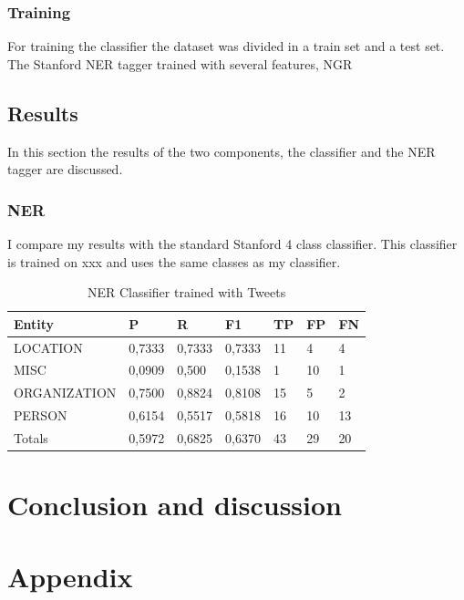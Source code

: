 \documentclass[
10pt, %
a4paper, %
oneside, %
headinclude,footinclude, %
BCOR5mm, %
]{scrartcl}
\begin{document}
\subsubsection{Training}
For training the classifier the dataset was divided in a train set and a test set. The Stanford NER tagger trained with several features, NGR


\newpage
\subsection{Results}
In this section the results of the two components, the classifier and the NER tagger are discussed.







\subsubsection{NER}
I compare my results with the standard Stanford 4 class classifier. This classifier is trained on xxx and uses the same classes as my classifier.

\begin{table}[h]
\caption[NER Classifier trained with Tweets]{NER Classifier trained with Tweets }
\begin{tabular}{|l|l|l|l|l|l|l|}
\hline
Entity       & P      & R      & F1     & TP & FP & FN   \\ \hline
LOCATION     & 0,7333 & 0,7333 & 0,7333 & 11 & 4  & 4    \\ \hline
MISC         & 0,0909 & 0,500  & 0,1538 & 1  & 10 & 1    \\ \hline
ORGANIZATION & 0,7500 & 0,8824 & 0,8108 & 15 & 5  & 2    \\ \hline
PERSON       & 0,6154 & 0,5517 & 0,5818 & 16 & 10 & 13   \\ \hline
Totals       & 0,5972 & 0,6825 & 0,6370 & 43 & 29 & 20 \\ \hline
\end{tabular}

\end{table}


\clearpage
\newpage
\section{Conclusion and discussion}
\lipsum[10]
\lipsum[10]

\newpage
\section{Appendix}
\end{document}
